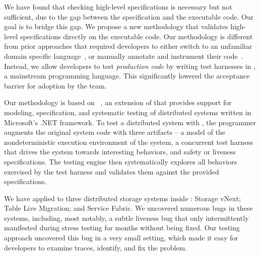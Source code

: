 We have found that checking high-level specifications is necessary but not sufficient, due to the gap between the specification and the executable code. Our goal is to bridge this gap. We propose a new methodology that validates high-level specifications directly on the executable code. Our methodology is different from prior approaches that required developers to either switch to an unfamiliar domain specific language~\cite{killian2007life, desai2015building}, or manually annotate and instrument their code~\cite{simsa2011dbug}. Instead, we allow developers to test \emph{production code} by writing test harnesses in \csharp, a mainstream programming language. This significantly lowered the acceptance barrier for adoption by the \Microsoft \Azure team.

Our methodology is based on \psharp~\cite{deligiannis2015psharp}, an extension of \csharp that provides support for modeling, specification, and systematic testing of distributed systems written in Microsoft's .NET framework. To test a distributed system with \psharp, the programmer augments the original system code with three artifacts -- a model of the nondeterministic execution environment of the system, a concurrent test harness that drives the system towards interesting behaviors, and safety or liveness specifications.
The \psharp testing engine then systematically explores all behaviors exercised by the test harness and validates them against the provided specifications.

We have applied \psharp to three distributed storage systems inside \Microsoft: \Azure Storage vNext; \Azure Table Live Migration; and \Azure Service Fabric.
We uncovered numerous bugs in these systems, including, most notably, a subtle liveness bug that only intermittently manifested during stress testing for months without being fixed.
Our testing approach uncovered this bug in a very small setting, which made it easy for developers to examine traces, identify, and fix the problem.

